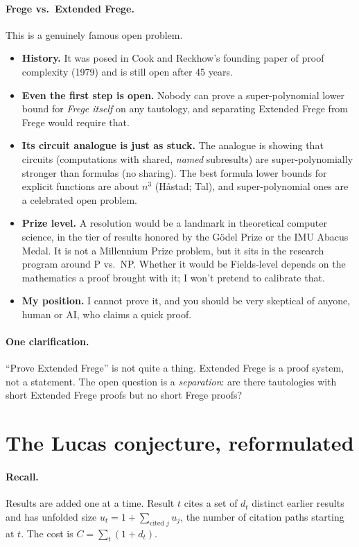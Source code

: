\documentclass[11pt]{article}
\theoremstyle{remark}
\begin{document}
\paragraph{Frege vs.\ Extended Frege.} This is a genuinely famous open problem.
\begin{itemize}
\item \textbf{History.} It was posed in Cook and Reckhow's founding paper of proof
  complexity (1979) and is still open after 45 years.
\item \textbf{Even the first step is open.} Nobody can prove a super-polynomial lower
  bound for \emph{Frege itself} on any tautology, and separating Extended Frege from
  Frege would require that.
\item \textbf{Its circuit analogue is just as stuck.} The analogue is showing that
  circuits (computations with shared, \emph{named} subresults) are super-polynomially
  stronger than formulas (no sharing). The best formula lower bounds for explicit
  functions are about $n^3$ (H\aa stad; Tal), and super-polynomial ones are a celebrated
  open problem.
\item \textbf{Prize level.} A resolution would be a landmark in theoretical computer
  science, in the tier of results honored by the G\"odel Prize or the IMU Abacus Medal.
  It is not a Millennium Prize problem, but it sits in the research program around
  P vs.\ NP. Whether it would be Fields-level depends on the mathematics a proof brought
  with it; I won't pretend to calibrate that.
\item \textbf{My position.} I cannot prove it, and you should be very skeptical of anyone,
  human or AI, who claims a quick proof.
\end{itemize}

\paragraph{One clarification.} ``Prove Extended Frege'' is not quite a thing. Extended
Frege is a proof system, not a statement. The open question is a \emph{separation}: are
there tautologies with short Extended Frege proofs but no short Frege proofs?

\section{The Lucas conjecture, reformulated}

\paragraph{Recall.} Results are added one at a time. Result $t$ cites a set of $d_t$
distinct earlier results and has unfolded size $u_t=1+\sum_{\text{cited }j}u_j$, the
number of citation paths starting at $t$. The cost is $C=\sum_t(1+d_t)$.
\end{document}
